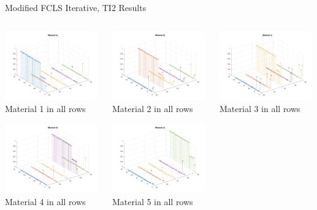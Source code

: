\documentclass{beamer}
\begin{document}
\begin{frame}{Modified FCLS Iterative, TI2 Results}
\begin{columns}
    \begin{column}{0.33\textwidth}
        \includegraphics[width=4cm,center]{mfcls_ti2_material_stem_1}
        \\ Material 1 in all rows
        \centering

        \includegraphics[width=4cm,center]{mfcls_ti2_material_stem_4}
        \\ Material 4 in all rows
        \centering
    \end{column}
    \begin{column}{0.33\textwidth}
        \includegraphics[width=4cm,center]{mfcls_ti2_material_stem_2}
        \\ Material 2 in all rows
        \centering

        \includegraphics[width=4cm,center]{mfcls_ti2_material_stem_5}
        \\ Material 5 in all rows
        \centering
    \end{column}
    \begin{column}{0.33\textwidth}
        \includegraphics[width=4cm,center]{mfcls_ti2_material_stem_3}
        \\ Material 3 in all rows
        \centering


\end{column}
\end{columns}
\end{frame}
\end{document}

